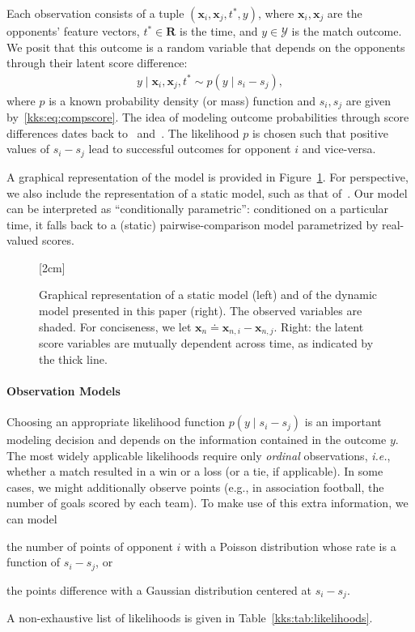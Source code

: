 Each observation consists of a tuple $(\bm{x}_i, \bm{x}_j, t^*, y)$, where $\bm{x}_i, \bm{x}_j$ are the opponents' feature vectors, $t^* \in \mathbf{R}$ is the time, and $y \in \mathcal{Y}$ is the match outcome.
We posit that this outcome is a random variable that depends on the opponents through their latent score difference:
\begin{align*}
	y \mid \bm{x}_i, \bm{x}_j, t^* \sim p( y \mid s_i - s_j ),
\end{align*}
where $p$ is a known probability density (or mass) function and $s_i, s_j$ are given by~\eqref{kks:eq:compscore}.
The idea of modeling outcome probabilities through score differences dates back to~\citet{thurstone1927law} and~\citet{zermelo1928berechnung}.
The likelihood $p$ is chosen such that positive values of $s_i - s_j$ lead to successful outcomes for opponent $i$ and vice-versa.

A graphical representation of the model is provided in Figure~\ref{kks:fig:pgms}.
For perspective, we also include the representation of a static model, such as that of~\citet{thurstone1927law}.
Our model can be interpreted as ``conditionally parametric'': conditioned on a particular time, it falls back to a (static) pairwise-comparison model parametrized by real-valued scores.

\begin{figure}[t]
	[2cm]{
		
	}
	\hfill
	\caption{
		Graphical representation of a static model (left) and of the dynamic model presented in this paper (right).
		The observed variables are shaded.
		For conciseness, we let $\bm{x}_n \doteq \bm{x}_{n,i} - \bm{x}_{n,j}$.
		Right: the latent score variables are mutually dependent across time, as indicated by the thick line.}
	\label{kks:fig:pgms}
\end{figure}

\paragraph{Observation Models}
Choosing an appropriate likelihood function $p(y \mid s_i - s_j)$ is an important modeling decision and depends on the information contained in the outcome $y$.
The most widely applicable likelihoods require only \emph{ordinal} observations, \textit{i.e.}, whether a match resulted in a win or a loss (or a tie, if applicable).
In some cases, we might additionally observe points (e.g., in association football, the number of goals scored by each team).
To make use of this extra information, we can model
\begin{enuminline}
	\item the number of points of opponent $i$ with a Poisson distribution whose rate is a function of $s_i - s_j$, or
	\item the points difference with a Gaussian distribution centered at $s_i - s_j$.
\end{enuminline}
A non-exhaustive list of likelihoods is given in Table~\ref{kks:tab:likelihoods}.

